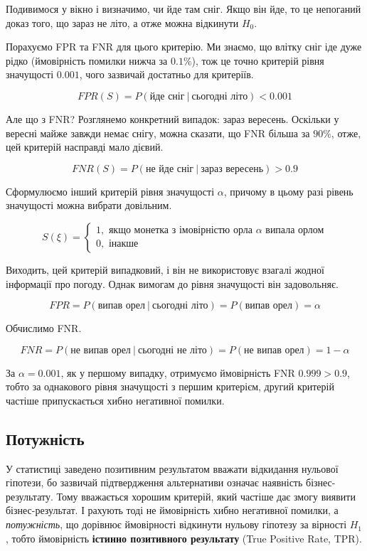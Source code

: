 \documentclass[
  letterpaper,
  10pt,
  openany]{report}
\theoremstyle{definition}
\theoremstyle{remark}
\begin{document}
Подивимося у вікно і визначимо, чи йде там сніг. Якщо він йде, то це
непоганий доказ того, що зараз не літо, а отже можна відкинути \(H_0\).

Порахуємо FPR та FNR для цього критерію. Ми знаємо, що влітку сніг іде
дуже рідко (ймовірність помилки нижча за \(0.1\%\)), тож це точно
критерій рівня значущості \(0.001\), чого зазвичай достатньо для
критеріїв.

\[
FPR(S) = P(\text{йде сніг}\ |\ \text{сьогодні літо}) < 0.001
\]

Але що з FNR? Розглянемо конкретний випадок: зараз вересень. Оскільки у
вересні майже завжди немає снігу, можна сказати, що FNR більша за
\(90\%\), отже, цей критерій насправді мало дієвий.

\[
FNR(S) = P(\text{не йде сніг}\ |\ \text{зараз вересень}) > 0.9
\]

Сформулюємо інший критерій рівня значущості \(\alpha\), причому в цьому
разі рівень значущості можна вибрати довільним.

\[
S(\xi) = \begin{cases}
    1, \text{ якщо монетка з імовірністю орла } \alpha \text{ випала орлом} \\
    0, \text{ інакше}
\end{cases}
\]

Виходить, цей критерій випадковий, і він не використовує взагалі жодної
інформації про погоду. Однак вимогам до рівня значущості він
задовольняє.

\[
FPR = P(\text{випав орел}\ |\ \text{сьогодні літо}) = P(\text{випав орел}) = \alpha
\]

Обчислимо FNR.

\[
FNR = P(\text{не випав орел}\ |\ \text{сьогодні не літо}) = P(\text{не випав орел}) = 1 - \alpha
\]

За \(\alpha = 0.001\), як у першому випадку, отримуємо ймовірність FNR
\(0.999 > 0.9\), тобто за однакового рівня значущості з першим
критерієм, другий критерій частіше припускається хибно негативної
помилки.

\subsection{Потужність}\label{ux43fux43eux442ux443ux436ux43dux456ux441ux442ux44c}

У статистиці заведено позитивним результатом вважати відкидання нульової
гіпотези, бо зазвичай підтвердження альтернативи означає наявність
бізнес-результату. Тому вважається хорошим критерій, який частіше дає
змогу виявити бізнес-результат. І рахують тоді не ймовірність хибно
негативної помилки, а \emph{потужність}, що дорівнює ймовірності
відкинути нульову гіпотезу за вірності \(H_1\), тобто ймовірність
\textbf{істинно позитивного результату} (True Positive Rate, TPR).
\end{document}
